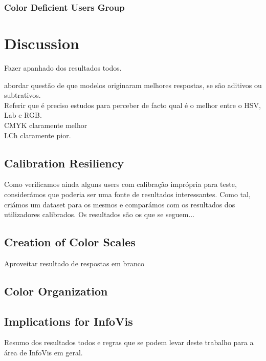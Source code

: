 \subsubsection{Color Deficient Users Group}
\label{subsubsec:demo_daltonic}
%
%
\section{Discussion}
\label{sec:results_discussion}
%
Fazer apanhado dos resultados todos. \par
abordar questão de que modelos originaram melhores respostas, se são aditivos ou subtrativos. \\
Referir que é preciso estudos para perceber de facto qual é o melhor entre o HSV, Lab e RGB. \\
CMYK claramente melhor \\
LCh claramente pior. \\
%
\subsection{Calibration Resiliency}
\label{subsec:results_calibration}
%
Como verificamos ainda alguns users com calibração imprópria para teste, considerámos que poderia ser uma fonte de resultados
interessantes. Como tal, criámos um dataset para os mesmos e comparámos com os resultados dos utilizadores calibrados. Os resultados
são os que se seguem... \par
%
\subsection{Creation of Color Scales}
\label{subsec:results_discussion_colorscales}
%
Aproveitar resultado de respostas em branco
%
\subsection{Color Organization}
\label{subsec:results_discussion_colororganization}

\subsection{Implications for InfoVis}
\label{subsec:results_discussion_infovis}
%
Resumo dos resultados todos e regras que se podem levar deste trabalho para a área de InfoVis em geral.
%
